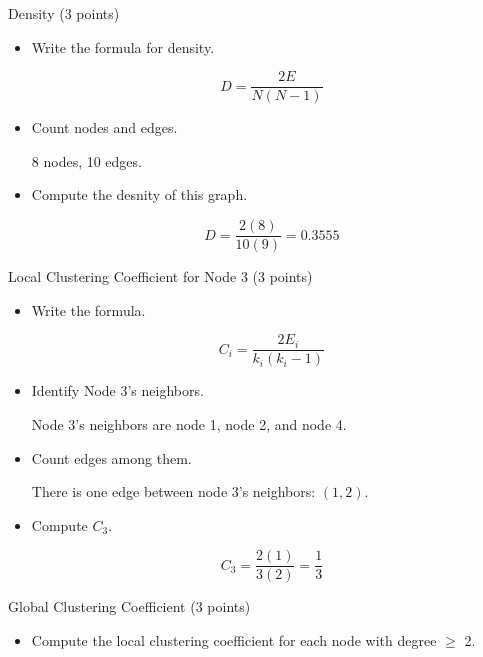\documentclass{article}
\begin{document}
\begin{enumerate}
    \item {
        Density (3 points)
        \begin{itemize}
            \item {
                Write the formula for density.

                \[D = \frac{2E}{N(N-1)}\]
            }

            \item {
                Count nodes and edges.

                8 nodes, 10 edges.
            }

            \item {
                Compute the desnity of this graph.

                \[D = \frac{2(8)}{10(9)} = 0.3555\]
            }
        \end{itemize}
    }

    \item {
        Local Clustering Coefficient for Node 3 (3 points)

        \begin{itemize}
            \item {
                Write the formula.

                \[C_i = \frac{2E_i}{k_i(k_i-1)}\]
            }

            \item {
                Identify Node 3’s neighbors.

                Node 3's neighbors are node 1, node 2, and node 4.
            }

            \item {
                Count edges among them.

                There is one edge between node 3's neighbors: \((1,2)\).
            }

            \item {
                Compute \(C_3\).

                \[C_3 = \frac{2(1)}{3(2)} = \frac{1}{3}\]
            }
        \end{itemize}

        \item {
            Global Clustering Coefficient (3 points)

            \begin{itemize}
                \item {
                    Compute the local clustering coefficient for each node with 
                    degree \(\ge\) 2.

}
\end{itemize}}}
\end{enumerate}
\end{document}
